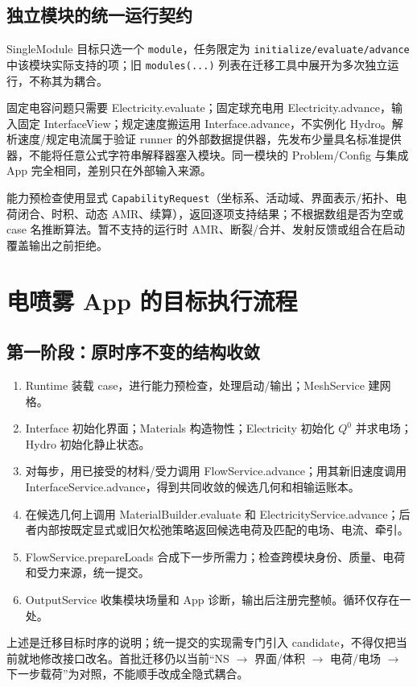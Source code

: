 \documentclass[UTF8,a4paper,11pt,fontset=fandol]{ctexart}
\numberwithin{equation}{section}
\newcommand{\code}[1]{\nolinkurl{#1}}
\begin{document}
\subsection{独立模块的统一运行契约}
SingleModule 目标只选一个 \code{module}，任务限定为 \code{initialize/evaluate/advance} 中该模块实际支持的项；旧 \code{modules(...)} 列表在迁移工具中展开为多次独立运行，不称其为耦合。

固定电容问题只需要 Electricity.evaluate；固定球充电用 Electricity.advance，输入固定 InterfaceView；规定速度搬运用 Interface.advance，不实例化 Hydro。解析速度/规定电流属于验证 runner 的外部数据提供器，先发布少量具名标准提供器，不能将任意公式字符串解释器塞入模块。同一模块的 Problem/Config 与集成 App 完全相同，差别只在外部输入来源。

能力预检查使用显式 \code{CapabilityRequest}（坐标系、活动域、界面表示/拓扑、电荷闭合、时积、动态 AMR、续算），返回逐项支持结果；不根据数组是否为空或 case 名推断算法。暂不支持的运行时 AMR、断裂/合并、发射反馈或组合在启动覆盖输出之前拒绝。

\section{电喷雾 App 的目标执行流程}\label{sec:workflow}
\subsection{第一阶段：原时序不变的结构收敛}
\begin{enumerate}
\item Runtime 装载 case，进行能力预检查，处理启动/输出；MeshService 建网格。
\item Interface 初始化界面；Materials 构造物性；Electricity 初始化 $Q^0$ 并求电场；Hydro 初始化静止状态。
\item 对每步，用已接受的材料/受力调用 FlowService.advance；用其新旧速度调用 InterfaceService.advance，得到共同收敛的候选几何和相输运账本。
\item 在候选几何上调用 MaterialBuilder.evaluate 和 ElectricityService.advance；后者内部按既定显式或旧欠松弛策略返回候选电荷及匹配的电场、电流、牵引。
\item FlowService.prepareLoads 合成下一步所需力；检查跨模块身份、质量、电荷和受力来源，统一提交。
\item OutputService 收集模块场量和 App 诊断，输出后注册完整帧。循环仅存在一处。
\end{enumerate}
上述是迁移目标时序的说明；统一提交的实现需专门引入 candidate，不得仅把当前就地修改接口改名。首批迁移仍以当前“NS $\to$ 界面/体积 $\to$ 电荷/电场 $\to$ 下一步载荷”为对照，不能顺手改成全隐式耦合。
\end{document}

